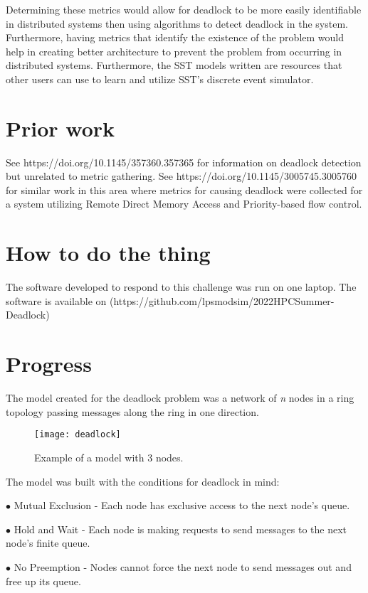 \documentclass{article}
\begin{document}
Determining these metrics would allow for deadlock to be more easily identifiable in distributed systems then using algorithms to detect deadlock in the system. Furthermore, having metrics that identify the existence of the problem would help in creating better architecture to prevent the problem from occurring in distributed systems. Furthermore, the SST models written are resources that other users can use to learn and utilize SST's discrete event simulator.

\section{Prior work} %

See https://doi.org/10.1145/357360.357365 for information on deadlock detection but unrelated to metric gathering.
See https://doi.org/10.1145/3005745.3005760 for similar work in this area where metrics for causing deadlock were collected for a system utilizing Remote Direct Memory Access and Priority-based flow control.

\section{How to do the thing}

The software developed to respond to this challenge was run on one laptop.
The software is available on (https://github.com/lpsmodsim/2022HPCSummer-Deadlock)

\section{Progress}
The model created for the deadlock problem was a network of \textit{n} nodes in a ring topology passing messages along the ring in one direction.

\begin{figure}[H]
\texttt{[image: deadlock]}\newline
\centering
\caption{Example of a model with 3 nodes.}
\centering
\end{figure}

The model was built with the conditions for deadlock in mind:

$\bullet$ Mutual Exclusion - Each node has exclusive access to the next node's queue.

$\bullet$ Hold and Wait - Each node is making requests to send messages to the next node's finite queue.

$\bullet$ No Preemption - Nodes cannot force the next node to send messages out and free up its queue.
\end{document}
